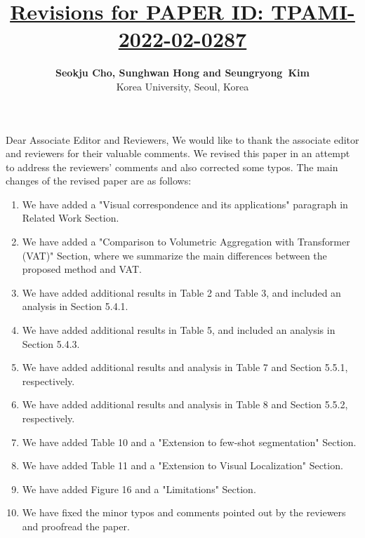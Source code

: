 \documentclass[11pt,draftclsnofoot,onecolumn]{IEEEtran}
\begin{document}
\title{\LARGE\underline{\textbf{Revisions for PAPER ID: TPAMI-2022-02-0287}}}

\author {\flushright \textbf{Seokju Cho, Sunghwan Hong and Seungryong~Kim}

\flushright Korea University, Seoul, Korea
}

\maketitle
\vspace{-1.5cm}
\noindent Dear Associate Editor and Reviewers,
\newline
\newline
\noindent 
We would like to thank the associate editor and reviewers for their valuable comments. 
We revised this paper in an attempt to address the reviewers' comments and also corrected some typos.
\newline
\noindent The main changes of the revised paper are as follows:

\begin{enumerate}
	\item We have added a "Visual correspondence and its applications" paragraph in Related Work Section.
	\item We have added a "Comparison to Volumetric Aggregation with Transformer (VAT)" Section, where we summarize the main differences between the proposed method and VAT.
	\item We have added additional results in Table 2 and Table 3, and included an analysis in Section 5.4.1.
	\item We have added additional results in Table 5, and included an analysis in Section 5.4.3.
	\item We have added additional results and analysis in Table 7 and Section 5.5.1, respectively.
	\item We have added additional results and analysis in Table 8 and Section 5.5.2, respectively.
	\item We have added  Table 10 and a "Extension to few-shot segmentation" Section.
	\item We have added  Table 11 and a "Extension to Visual Localization" Section.
	\item We have added  Figure 16 and a "Limitations" Section.
	\item We have fixed the minor typos and comments pointed out by the reviewers and proofread the paper.
\end{enumerate}
\end{document}

